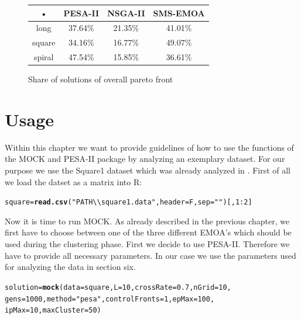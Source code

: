 \documentclass[parskip=half,DIV=14]{scrartcl}\usepackage[]{graphicx}\usepackage[]{color}
\makeatletter
\newcommand{\hlnum}[1]{\textcolor[rgb]{0.686,0.059,0.569}{#1}}%
\newcommand{\hlstr}[1]{\textcolor[rgb]{0.192,0.494,0.8}{#1}}%
\newcommand{\hlopt}[1]{\textcolor[rgb]{0,0,0}{#1}}%
\newcommand{\hlstd}[1]{\textcolor[rgb]{0.345,0.345,0.345}{#1}}%
\newcommand{\hlkwb}[1]{\textcolor[rgb]{0.69,0.353,0.396}{#1}}%
\newcommand{\hlkwc}[1]{\textcolor[rgb]{0.333,0.667,0.333}{#1}}%
\newcommand{\hlkwd}[1]{\textcolor[rgb]{0.737,0.353,0.396}{\textbf{#1}}}%
\newenvironment{kframe}{%
 \def\at@end@of@kframe{}%
 \ifinner\ifhmode%
  \def\at@end@of@kframe{\end{minipage}}%
  \begin{minipage}{\columnwidth}%
 \fi\fi%
 \def\FrameCommand##1{\hskip\@totalleftmargin \hskip-\fboxsep
 \colorbox{shadecolor}{##1}\hskip-\fboxsep
     \hskip-\linewidth \hskip-\@totalleftmargin \hskip\columnwidth}%
 \MakeFramed {\advance\hsize-\width
   \@totalleftmargin\z@ \linewidth\hsize
   \@setminipage}}%
 {\par\unskip\endMakeFramed%
 \at@end@of@kframe}
\newenvironment{knitrout}{}{} %
\makeatother
\begin{document}
\begin{figure}[h]
\begin{center}
\begin{tabular}{|c|c|c|c|}
\hline 
• & PESA-II & NSGA-II & SMS-EMOA \\ 
\hline 
long & 37.64\% & 21.35\% &  41.01\% \\ 
\hline 
square &34.16\%& 16.77\% & 49.07\% \\ 
\hline 
spiral & 47.54\% & 15.85\% & 36.61\% \\ 
\hline 
\end{tabular} 
\caption{Share of solutions of overall pareto front}
\end{center}
\end{figure}


\section{Usage}
Within this chapter we want to provide guidelines of how to use the functions of the MOCK and PESA-II package by analyzing an exemplary dataset. For our purpose we use the Square1 dataset which was already analyzed in \cite{handl2007}. First of all we load the datset as a matrix into R:




\begin{knitrout}
\color{fgcolor}\begin{kframe}
\begin{alltt}
\hlstd{square} \hlkwb{=} \hlkwd{read.csv}\hlstd{(}\hlstr{"PATH\textbackslash{}\textbackslash{}square1.data"}\hlstd{,}\hlkwc{header} \hlstd{= F,} \hlkwc{sep} \hlstd{=} \hlstr{" "}\hlstd{)[,}\hlnum{1}\hlopt{:}\hlnum{2}\hlstd{]}
\end{alltt}
\end{kframe}
\end{knitrout}

Now it is time to run MOCK. As already described in the previous chapter, we first have to choose between one of the three different EMOA's which should be used during the clustering phase. First we decide to use PESA-II. Therefore we have to provide all necessary parameters. In our case we use the parameters used for analyzing the data in section six. 



\begin{knitrout}
\color{fgcolor}\begin{kframe}
\begin{alltt}
\hlstd{solution} \hlkwb{=} \hlkwd{mock}\hlstd{(}\hlkwc{data} \hlstd{= square,}\hlkwc{L} \hlstd{=} \hlnum{10}\hlstd{,}\hlkwc{crossRate} \hlstd{=} \hlnum{0.7}\hlstd{,}\hlkwc{nGrid} \hlstd{=} \hlnum{10}\hlstd{,}
           \hlkwc{gens} \hlstd{=} \hlnum{1000}\hlstd{,}\hlkwc{method}\hlstd{=}\hlstr{"pesa"}\hlstd{,}\hlkwc{controlFronts} \hlstd{=} \hlnum{1}\hlstd{,}\hlkwc{epMax} \hlstd{=} \hlnum{100}\hlstd{,}
           \hlkwc{ipMax} \hlstd{=} \hlnum{10}\hlstd{,}\hlkwc{maxCluster}\hlstd{=}\hlnum{50}\hlstd{)}
\end{alltt}
\end{kframe}
\end{knitrout}
\end{document}
